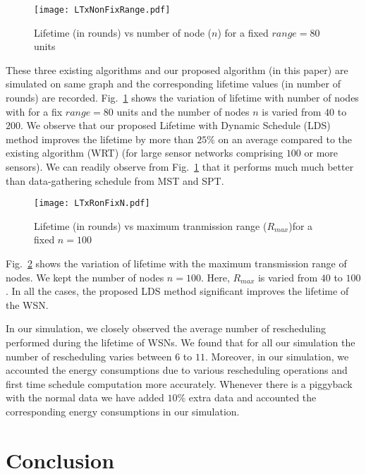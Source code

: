 \documentclass[10pt]{llncs}
\begin{document}
\begin{figure}[!ht]
\centerline{\texttt{[image: LTxNonFixRange.pdf]}}
\caption{Lifetime (in rounds) vs number of node ($n$) for a fixed $range = 80$ units}
\label{Plot:fixRange}
\end{figure}

These three existing algorithms and our proposed algorithm (in this paper) are simulated on same graph and the corresponding lifetime values (in number of rounds) are recorded. Fig.~\ref{Plot:fixRange} shows the variation of lifetime with number of nodes with for a fix $range=80$ units and the number of nodes $n$ is varied from $40$ to $200$. We observe that our proposed Lifetime with Dynamic Schedule (LDS) method improves the lifetime by more than $25\%$ on an average compared to the existing algorithm (WRT) \cite{Bhattacharjee07} (for large sensor networks comprising $100$ or more sensors). We can readily observe from Fig.~\ref{Plot:fixRange} that it performs much much better than data-gathering schedule from MST and SPT.

\begin{figure}[!ht]
\centerline{\texttt{[image: LTxRonFixN.pdf]}}
\caption{Lifetime (in rounds) vs maximum tranmission range ($R_{max}$)for a fixed $n=100$}
\label{Plot:fixN}
\end{figure}

Fig.~\ref{Plot:fixN} shows the variation of lifetime with the maximum transmission range of nodes. We kept the number of nodes $n = 100$. Here, $R_{max}$ is varied from $40$ to $100$. In all the cases, the proposed LDS method significant improves the lifetime of the WSN. 

In our simulation, we closely observed the average number of rescheduling performed during the lifetime of WSNs. We found that for all our simulation the number of rescheduling varies between $6$ to $11$. Moreover, in our simulation, we accounted the energy consumptions due to various rescheduling operations and first time schedule computation more accurately. Whenever there is a piggyback with the normal data we have added $10\%$ extra data and accounted the corresponding energy consumptions in our simulation.

\section{Conclusion}
\end{document}

